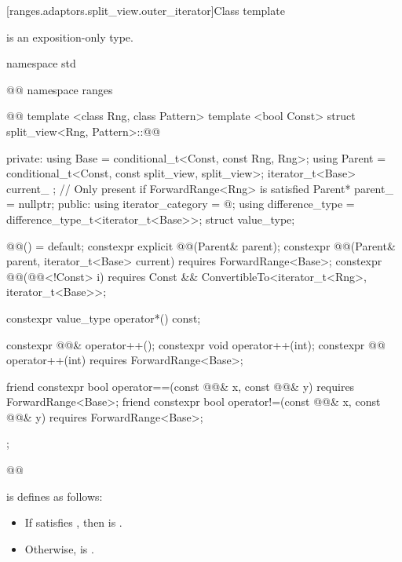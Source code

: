 [ranges.adaptors.split_view.outer_iterator]{Class template }

\pnum
\enternote {} is an exposition-only type.\exitnote

\begin{codeblock}
namespace std { @@ namespace ranges { @@
  template <class Rng, class Pattern>
  template <bool Const>
  struct split_view<Rng, Pattern>::@@ {
  private:
    using Base = conditional_t<Const, const Rng, Rng>;
    using Parent = conditional_t<Const, const split_view, split_view>;
    iterator_t<Base> current_ {}; // Only present if ForwardRange<Rng> is satisfied
    Parent* parent_ = nullptr;
  public:
    using iterator_category = @\seebelow@;
    using difference_type = difference_type_t<iterator_t<Base>>;
    struct value_type;

    @@() = default;
    constexpr explicit @@(Parent& parent);
    constexpr @@(Parent& parent, iterator_t<Base> current)
      requires ForwardRange<Base>;
    constexpr @@(@@<!Const> i) requires Const &&
      ConvertibleTo<iterator_t<Rng>, iterator_t<Base>>;

    constexpr value_type operator*() const;

    constexpr @@& operator++();
    constexpr void operator++(int);
    constexpr @@ operator++(int) requires ForwardRange<Base>;

    friend constexpr bool operator==(const @@& x, const @@& y)
      requires ForwardRange<Base>;
    friend constexpr bool operator!=(const @@& x, const @@& y)
      requires ForwardRange<Base>;
  };
}}@\removed{\}\}}@
\end{codeblock}

\pnum
{} is defines
as follows:
\begin{itemize}
\item If  satisfies , then
 is .
\item Otherwise,  is .
\end{itemize}


